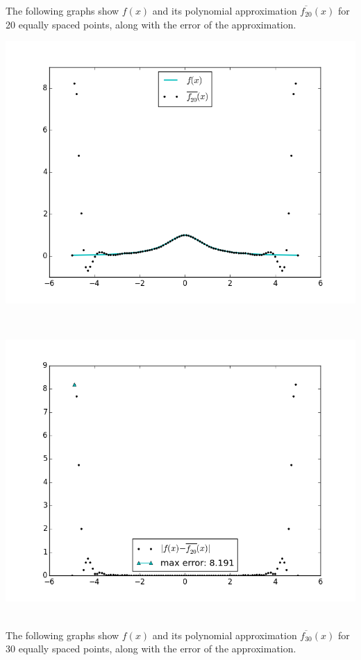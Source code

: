\documentclass[12pt]{article}
\begin{document}
The following graphs show $f(x)$ and its polynomial approximation $\overline{f_{20}}(x)$ for 20 equally spaced points, along with the error of the approximation.\\
\centerline{\includegraphics[scale=0.65]{figures/problem4_d_020points.png}}\\
\centerline{\includegraphics[scale=0.65]{figures/problem4_e_020points.png}}\\
The following graphs show $f(x)$ and its polynomial approximation $\overline{f_{30}}(x)$ for 30 equally spaced points, along with the error of the approximation.\\
\end{document}
